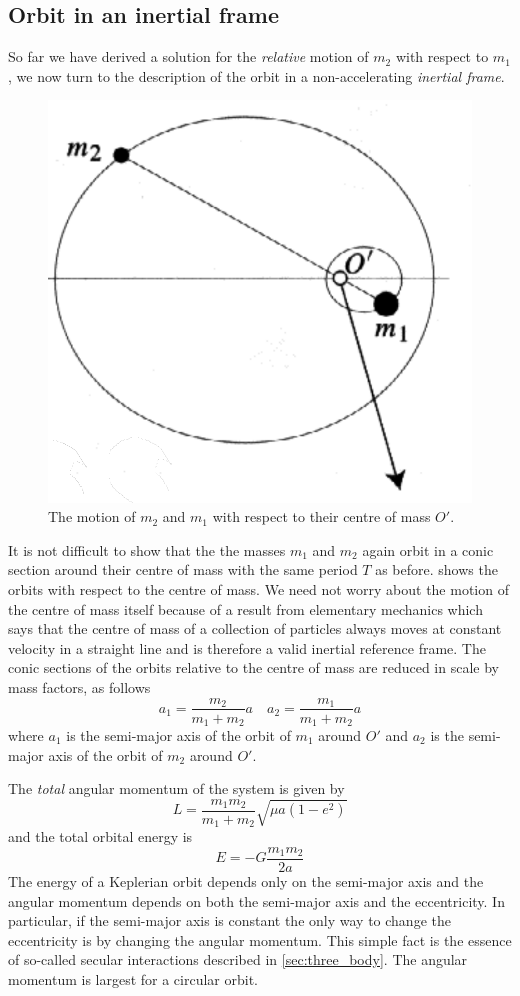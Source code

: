 \documentclass[ twoside,openright,titlepage,numbers=noenddot,headinclude,%
                footinclude=true,cleardoublepage=empty,abstractoff, %
                BCOR=5mm,paper=a4,fontsize=11pt,%
                american,%
                ]{scrreprt}
\begin{document}
\subsection{Orbit in an inertial frame}
So far we have derived a solution for the \emph{relative} motion
of $m_2$ with respect to $m_1$, we now turn to the description of the
orbit in a non-accelerating \emph{inertial frame}.
\begin{figure}[htb]
\centering
\includegraphics[width=0.5\linewidth]{gfx/barycentric_orbit.png}
\caption{The motion of $m_2$ and $m_1$ with respect to their centre
    of mass $O'$.}
\label{fig:barycentric_orbit}
\end{figure}
It is not difficult to show that the the masses $m_1$ and $m_2$ again
orbit in a conic section around their centre of mass with the same
period $T$ as before. 
 shows the orbits with respect to the
centre of mass. We need not worry about the motion of the centre
of mass itself because of a result from elementary mechanics which says
that the centre of mass of a collection of particles always moves at
constant velocity in a straight line and is therefore a valid inertial
reference frame. The conic sections of the orbits relative to the centre
of mass are 
reduced in scale by mass factors, as follows
\begin{equation}
    a_1= \frac{m_2}{m_1 + m_2} a\quad a_2= \frac{m_1}{m_1 + m_2} a
\end{equation}
where $a_1$ is the semi-major axis of the orbit of $m_1$ around $O'$
and $a_2$ is the semi-major axis of the orbit of $m_2$ around $O'$.

The \emph{total} angular momentum of the system is given by 
\begin{equation}
    L= \frac{m_1 m_2}{m_1 + m_2} \sqrt{\mu a(1-e^2)}
    \label{eq:ang_momentum}
\end{equation}
and the total orbital energy is
\begin{equation}
    E= -G \frac{m_1 m_2}{2a} 
\end{equation}
The energy of a Keplerian orbit depends only on the semi-major axis
and the angular momentum depends on both the semi-major axis and
the eccentricity. In particular, if the semi-major axis is constant
the only way to change the eccentricity is by changing the angular
momentum. This simple fact is the essence of so-called secular
interactions described in \cref{sec:three_body}. The angular momentum
is largest for a circular orbit.
\end{document}

